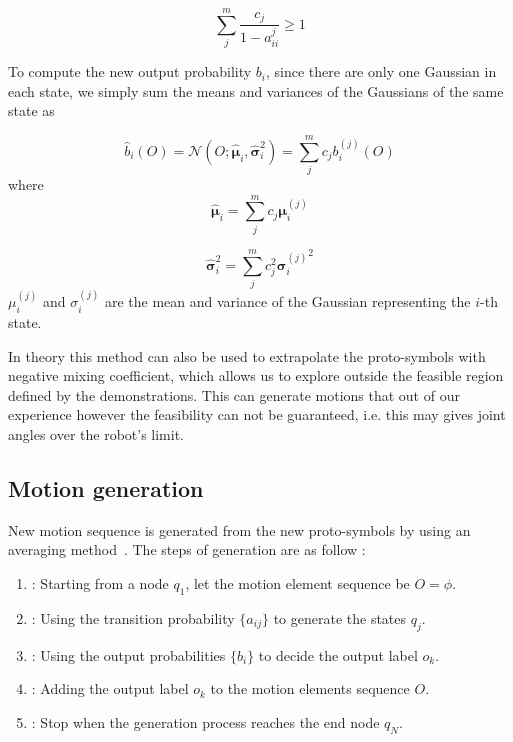 \begin{equation}
\sum_j^m\frac{c_j}{1-a^j_{ii}} \ge 1
\end{equation}

To compute the new output probability $b_i$, since there are only one Gaussian in each state, we simply sum the means and variances of the Gaussians of the same state as

\begin{equation}
\hat{b}_i(O) = \mathcal{N}(O;\hat{\boldsymbol{\mu}}_i,\hat{\boldsymbol{\sigma}}_i^2) = \sum_j^m{c_jb_i^{(j)}(O)}
\end{equation}
where
\begin{equation}
\hat{\boldsymbol{\mu}}_i = \sum_j^mc_j\boldsymbol{\mu}_i^{(j)}
\end{equation}

\begin{equation}
\hat{\boldsymbol{\sigma}}_i^2 = \sum_j^mc_j^2{\boldsymbol{\sigma}_i^{(j)}}^2
\end{equation}
$\mu_i^{(j)}$ and ${\sigma_i^{(j)}}$ are the mean and variance of the Gaussian representing the $i$-th state.

In theory this method can also be used to extrapolate the proto-symbols with negative mixing coefficient, which allows us to explore outside the feasible region defined by the demonstrations. This can generate motions that out of our experience however the feasibility can not be guaranteed, i.e. this may gives joint angles over the robot's limit.

\subsection{Motion generation}
\label{cha5:sec2:generating}
New motion sequence is generated from the new proto-symbols by using an averaging method~\citep{inamura2004embodied}.
The steps of generation are as follow :

\begin{enumerate}
\item: Starting from a node $q_1$, let the motion element sequence be $O = \phi$.
\item: Using the transition probability $\{a_{ij}\}$ to generate the states $q_j$.
\item: Using the output probabilities $\{b_i\}$ to decide the output label $o_k$.
\item: Adding the output label $o_k$ to the motion elements sequence $O$.
\item: Stop when the generation process reaches the end node $q_N$.
\end{enumerate}

